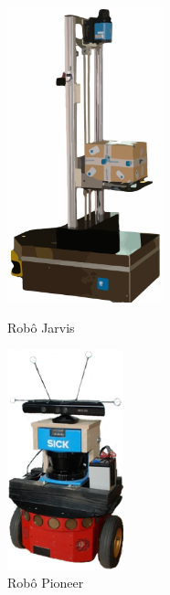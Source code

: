 \documentclass[9pt,a4paper]{extarticle}
\begin{document}
\begin{multicols}{2}
\vspace{-7pt}
\begin{figure}[H]
	\centering
	\begin{minipage}[b]{0.23\textwidth}
		\centering
		\includegraphics[width=0.4\textwidth]{jarvis}
		\caption{\small Robô Jarvis}
		\label{fig:jarvis}
	\end{minipage}\hfill
	\begin{minipage}[b]{0.23\textwidth}
		\centering
		\includegraphics[width=0.3\textwidth]{pioneer-3dx}
		\caption{\small Robô Pioneer \cite{Sturm2012}}
		\label{fig:pioneer}
	\end{minipage}
\end{figure}


\end{multicols}
\end{document}
